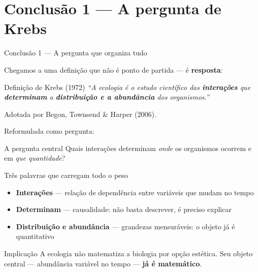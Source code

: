 \documentclass[12pt]{beamer}
\begin{document}
\section{Conclusão 1 — A pergunta de Krebs}

\begin{frame}{Conclusão 1 — A pergunta que organiza tudo}

  Chegamos a uma definição que não é ponto de partida --- é \textbf{resposta}:

  \bigskip
  \begin{block}{Definição de Krebs (1972)}
    \itshape
    ``A ecologia é o estudo científico das \textbf{interações}
    que \textbf{determinam} a \textbf{distribuição e a abundância}
    dos organismos.''
  \end{block}

  \vspace{0.3em}
  {\small Adotada por Begon, Townsend \& Harper (2006).}

  \bigskip
  Reformulada como pergunta:

  \bigskip
  \begin{exampleblock}{A pergunta central}
    \centering
    Quais interações determinam \emph{onde} os organismos
    ocorrem e em \emph{que quantidade}?
  \end{exampleblock}

\end{frame}

\begin{frame}{Três palavras que carregam todo o peso}

  \begin{itemize}
    \item \textbf{Interações} --- relação de dependência entre variáveis
      que mudam no tempo
    \bigskip
    \item \textbf{Determinam} --- causalidade: não basta descrever,
      é preciso explicar
    \bigskip
    \item \textbf{Distribuição e abundância} --- grandezas mensuráveis:
      o objeto já é quantitativo
  \end{itemize}

  \bigskip
  \begin{exampleblock}{Implicação}
    A ecologia não matematiza a biologia por opção estética.
    Seu objeto central --- abundância variável no tempo ---
    \textbf{já é matemático}.
  \end{exampleblock}

\end{frame}
\end{document}
